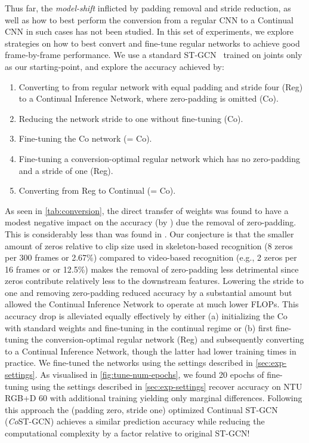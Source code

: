 \documentclass[journal]{IEEEtran}
\theoremstyle{definition}
\begin{document}
Thus far, the \textit{model-shift} inflicted by padding removal and stride reduction, as well as how to best perform the conversion from a regular CNN to a Continual CNN in such cases has not been studied. 
In this set of experiments, we explore strategies on how to best convert and fine-tune regular networks to achieve good frame-by-frame performance.
We use a standard ST-GCN~\cite{yan2018spatial} trained on joints only as our starting-point, and explore the accuracy achieved by:
\begin{enumerate}
    \itemsep0em 
    \item Converting to from regular network with equal padding and stride four (Reg) to a Continual Inference Network, where zero-padding is omitted (Co).
    \item Reducing the network stride to one without fine-tuning (Co).
    \item Fine-tuning the Co network (= Co).
    \item Fine-tuning a conversion-optimal regular network which has no zero-padding and a stride of one (Reg).
    \item Converting from Reg to Continual (= Co).
\end{enumerate}
As seen in \cref{tab:conversion}, the direct transfer of weights was found to have a modest negative impact on the accuracy (by ) due the removal of zero-padding. This is considerably less than was found in \cite{hedegaard2021continual}. Our conjecture is that the smaller amount of zeros relative to clip size used in skeleton-based recognition (8 zeros per 300 frames or 2.67\%) compared to video-based recognition (e.g., 2 zeros per 16 frames or or 12.5\%) makes the removal of zero-padding less detrimental since zeros contribute relatively less to the downstream features.
Lowering the stride to one and removing zero-padding reduced accuracy by a substantial amount but allowed the Continual Inference Network to operate at much lower FLOPs. This accuracy drop is alleviated equally effectively by either (a) initializing the Co with standard weights and fine-tuning in the continual regime or (b) first fine-tuning the conversion-optimal regular network (Reg) and subsequently converting to a Continual Inference Network, though the latter had lower training times in practice.
We fine-tuned the networks using the settings described in \cref{sec:exp-settings}.
As visualised in \cref{fig:tune-num-epochs}, we found 20 epochs of fine-tuning using the settings described in \cref{sec:exp-settings} recover accuracy on NTU RGB+D 60 with additional training yielding only marginal differences. 
Following this approach the (padding zero, stride one) optimized Continual ST-GCN (\textit{Co}ST-GCN) achieves a similar prediction accuracy while reducing the computational complexity by a factor  relative to original ST-GCN!
\end{document}
